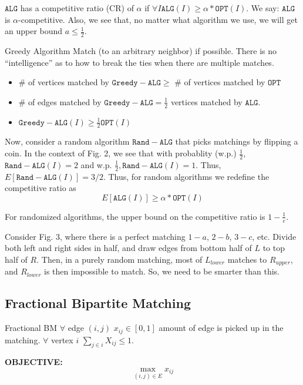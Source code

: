 $\mathtt{ALG}$ has a competitive ratio (CR) of $\alpha$ if $\forall I \mathtt{ALG}(I) \geq \alpha * \mathtt{OPT}(I)$. We say: $\mathtt{ALG}$ is $\alpha$-competitive. Also, we see that, no matter what algorithm we use, we will get an upper bound $a \leq \frac{1}{2}$.


\begin{algorithm}{Greedy Algorithm}
  \label{alg:greedy-algorithm}
  Match (to an arbitrary neighbor) if possible. There is no ``intelligence'' as to how to break the ties when there are multiple matches. 
  \begin{itemize}
  \item \# of vertices matched by $\mathtt{Greedy-ALG} \geq$ \# of vertices matched by $\mathtt{OPT}$
  \item \# of edges matched by $\mathtt{Greedy-ALG} = \frac{1}{2}$ vertices matched by $\mathtt{ALG}$.
  \item $\mathtt{Greedy-ALG}(I)\geq \frac{1}{2} \mathtt{OPT}(I)$
  \end{itemize}
\end{algorithm}

Now, consider a random algorithm $\mathtt{Rand-ALG}$ that picks matchings by flipping a coin. In the context of Fig. 2, we see that with probablity (w.p.) $\frac{1}{2}$, $\mathtt{Rand-ALG}(I) = 2$ and w.p. $\frac{1}{2}, \mathtt{Rand-ALG}(I) = 1$. Thus, $E[\mathtt{Rand-ALG}(I)] = 3/2$. Thus, for random algorithms we redefine the competitive ratio as
\begin{equation}
  \label{eq:competitive-ratio}
  E[\mathtt{ALG}(I)] \geq \alpha * \mathtt{OPT}(I)  
\end{equation}

For randomized algorithms, the upper bound on the competitive ratio is $1 - \frac{1}{e}$.

Consider Fig. 3, where there is a perfect matching $1-a$, $2-b$, $3-c$, etc. Divide both left and right sides in half, and draw edges from bottom half of $L$ to top half of $R$. Then, in a purely random matching, most of $L_{lower}$ matches to $R_{upper}$, and $R_{lower}$ is then impossible to match. So, we need to be smarter than this.

\subsection{Fractional Bipartite Matching}
\label{sec:frac-bm}


\begin{algorithm}{Fractional BM}
  $\forall $ edge $(i,j)$ $x_{ij} \in [0,1]$ amount of edge is picked up in the matching. $\forall$ vertex $i$ $\sum_{j \in i}X_{ij} \leq 1$. %

\textbf{OBJECTIVE:}
\begin{equation}
  \label{eq:fractional-bm-objective}
  \max_{(i,j) \in E} x_{ij}
\end{equation}

\end{algorithm}



